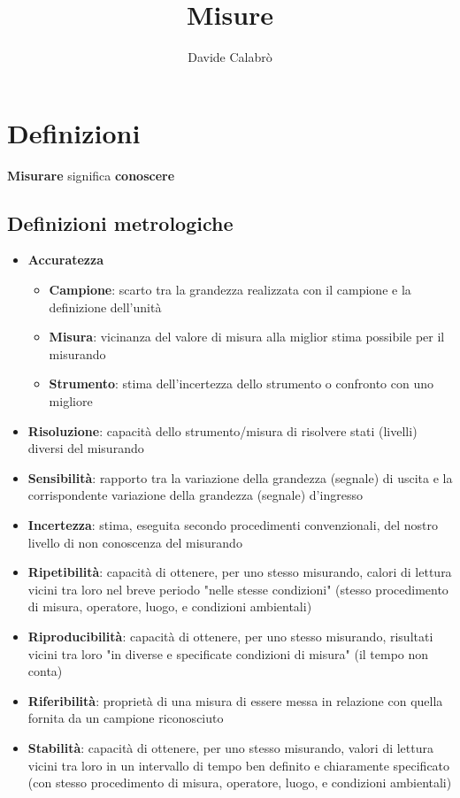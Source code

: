 \documentclass{article}
\title{Misure}
\author{Davide Calabrò}
\begin{document}
	\maketitle
	\newpage
	
	\section*{Definizioni}
	\textbf{Misurare} significa \textbf{conoscere}\\
	
	\subsection*{Definizioni metrologiche}
	\begin{itemize}
		\item \textbf{Accuratezza}
			\begin{itemize}
				\item \textbf{Campione}: scarto tra la grandezza 		realizzata con il campione e la definizione dell'unità
				\item \textbf{Misura}: vicinanza del valore di misura alla miglior stima possibile per il misurando
				\item \textbf{Strumento}: stima dell'incertezza dello strumento o confronto con uno migliore
			\end{itemize}
		\item \textbf{Risoluzione}: capacità dello strumento/misura di risolvere stati (livelli) diversi del misurando
		\item \textbf{Sensibilità}: rapporto tra la variazione della grandezza (segnale) di uscita e la corrispondente variazione della grandezza (segnale) d'ingresso
		\item \textbf{Incertezza}: stima, eseguita secondo procedimenti convenzionali, del nostro livello di non conoscenza del misurando
		\item \textbf{Ripetibilità}: capacità di ottenere, per uno stesso misurando, calori di lettura vicini tra loro nel breve periodo "nelle stesse condizioni" (stesso procedimento di misura, operatore, luogo, e condizioni ambientali)
		\item \textbf{Riproducibilità}: capacità di ottenere, per uno stesso misurando, risultati vicini tra loro "in diverse e specificate condizioni di misura" (il tempo non conta)
		\item \textbf{Riferibilità}: proprietà di una misura di essere messa in relazione con quella fornita da un campione riconosciuto
		\item \textbf{Stabilità}: capacità di ottenere, per uno stesso misurando, valori di lettura vicini tra loro in un intervallo di tempo ben definito e chiaramente specificato (con stesso procedimento di misura, operatore, luogo, e condizioni ambientali)			
	\end{itemize}
\end{document}
